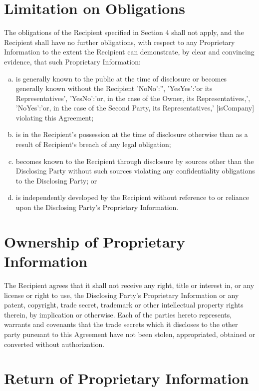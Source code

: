 \documentclass[12pt]{article}
\newcommand{\VAR}[1]{{\color{blue}#1}}
\newcommand{\representativesMention}[1]{
    \VAR{
        {
            'NoNo':'',
            'YesYes':'#1 its Representatives',
            'YesNo':'#1, in the case of the Owner, its Representatives,',
            'NoYes':'#1, in the case of the Second Party, its Representatives,'
        }[isCompany]
    }
}
\begin{document}
\section{Limitation on Obligations} \label{sec:limitOblig}
The obligations of the Recipient specified in Section 4 shall not apply, and the Recipient shall have no further obligations, with respect to any Proprietary Information to the extent the Recipient can demonstrate, by clear and convincing evidence, that such Proprietary Information:
\begin{enumerate}[a)]
\item is generally known to the public at the time of disclosure or becomes generally known without the Recipient \representativesMention{or} violating this Agreement;
\item  is in the Recipient’s possession at the time of disclosure otherwise than as a result of Recipient`s breach of any legal obligation;
\item becomes known to the Recipient through disclosure by sources other than the Disclosing Party without such sources violating any confidentiality obligations to the Disclosing Party; or
\item is independently developed by the Recipient without reference to or reliance upon the Disclosing Party's Proprietary Information.
\end{enumerate}

\section{Ownership of Proprietary Information}
The Recipient agrees that it shall not receive any right, title or interest in, or any license or right to use, the Disclosing Party's Proprietary Information or any patent, copyright, trade secret, trademark or other intellectual property rights therein, by implication or otherwise.
Each of the parties hereto represents, warrants and covenants that the trade secrets which it discloses to the other party pursuant to this Agreement have not been stolen, appropriated, obtained or converted without authorization.

\section{Return of Proprietary Information}
\end{document}
